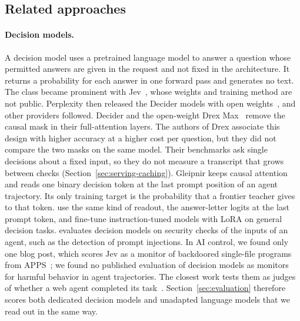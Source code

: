\subsection{Related approaches}
\label{sec:background-related}

\paragraph{Decision models.}
A decision model uses a pretrained language model to answer a question whose permitted answers are given in the request and not fixed in the architecture.
It returns a probability for each answer in one forward pass and generates no text.
The class became prominent with Jev~\citep{almeida2026jev}, whose weights and training method are not public.
Perplexity then released the Decider models with open weights~\citep{perplexity2026decider}, and other providers followed.
Decider and the open-weight Drex Max~\citep{dhankhar2026drex} remove the causal mask in their full-attention layers.
The authors of Drex associate this design with higher accuracy at a higher cost per question, but they did not compare the two masks on the same model.
Their benchmarks ask single decisions about a fixed input, so they do not measure a transcript that grows between checks (Section~\ref{sec:serving-caching}).
Gleipnir keeps causal attention and reads one binary decision token at the last prompt position of an agent trajectory.
Its only training target is the probability that a frontier teacher gives to that token.
\citet{geuter2026releasing} use the same kind of readout, the answer-letter logits at the last prompt token, and fine-tune instruction-tuned models with LoRA on general decision tasks.
\citet{liu2026evaluating} evaluates decision models on security checks of the inputs of an agent, such as the detection of prompt injections.
In AI control, we found only one blog post, which scores Jev as a monitor of backdoored single-file programs from APPS~\citep{t2026jevmonitor}; we found no published evaluation of decision models as monitors for harmful behavior in agent trajectories.
The closest work tests them as judges of whether a web agent completed its task~\citep{subramanian2026jev}.
Section~\ref{sec:evaluation} therefore scores both dedicated decision models and unadapted language models that we read out in the same way.

